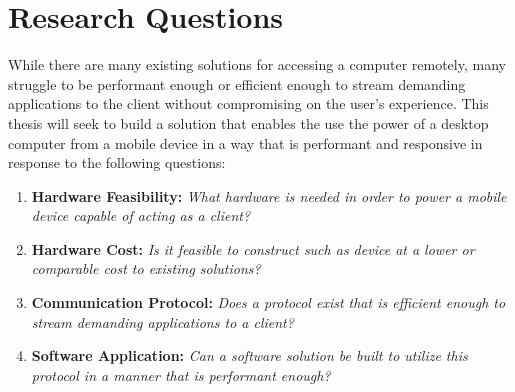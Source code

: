 \section{Research Questions}\label{sec:ResearchQuestions}

While there are many existing solutions for accessing a computer remotely, many struggle to be performant enough or efficient enough to stream demanding applications to the client without compromising on the user's experience.
This thesis will seek to build a solution that enables the use the power of a desktop computer from a mobile device in a way that is performant and responsive in response to the following questions:

\begin{enumerate}
  \item \textbf{Hardware Feasibility:} \emph{What hardware is needed in order to power a mobile device capable of acting as a client?}
  \item \textbf{Hardware Cost:} \emph{Is it feasible to construct such as device at a lower or comparable cost to existing solutions?}
  \item \textbf{Communication Protocol:} \emph{Does a protocol exist that is efficient enough to stream demanding applications to a client?}
  \item \textbf{Software Application:} \emph{Can a software solution be built to utilize this protocol in a manner that is performant enough?}
\end{enumerate}